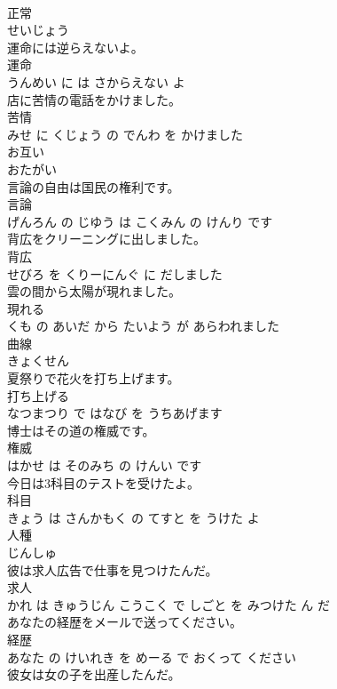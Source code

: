 \documentclass[8pt]{extreport}
\begin{document}
\begin{CJK}{UTF8}{min}
\\	正常	
\\	せいじょう			
\\	運命には逆らえないよ。	
\\	運命 
\\	うんめい に は さからえない よ			
\\	店に苦情の電話をかけました。	
\\	苦情 
\\	みせ に くじょう の でんわ を かけました			
\\	お互い	
\\	おたがい			
\\	言論の自由は国民の権利です。	
\\	言論 
\\	げんろん の じゆう は こくみん の けんり です			
\\	背広をクリーニングに出しました。	
\\	背広 
\\	せびろ を くりーにんぐ に だしました			
\\	雲の間から太陽が現れました。	
\\	現れる 
\\	くも の あいだ から たいよう が あらわれました			
\\	曲線	
\\	きょくせん			
\\	夏祭りで花火を打ち上げます。	
\\	打ち上げる 
\\	なつまつり で はなび を うちあげます			
\\	博士はその道の権威です。	
\\	権威 
\\	はかせ は そのみち の けんい です			
\\	今日は3科目のテストを受けたよ。	
\\	科目 
\\	きょう は さんかもく の てすと を うけた よ			
\\	人種	
\\	じんしゅ			
\\	彼は求人広告で仕事を見つけたんだ。	
\\	求人 
\\	かれ は きゅうじん こうこく で しごと を みつけた ん だ			
\\	あなたの経歴をメールで送ってください。	
\\	経歴 
\\	あなた の けいれき を めーる で おくって ください			
\\	彼女は女の子を出産したんだ。	

\end{CJK}
\end{document}
